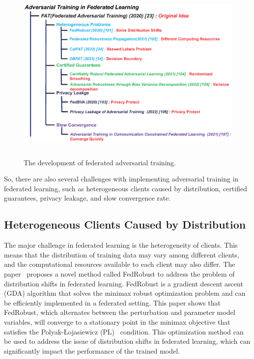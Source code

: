 \documentclass[pdflatex,sn-mathphys-num]{sn-jnl}%
\theoremstyle{thmstyleone}%
\theoremstyle{thmstyletwo}%
\theoremstyle{thmstylethree}%
\begin{document}
\begin{figure}[h]
	\centering
	\includegraphics[width=1.0\linewidth,height=3.5in]{output/fig20.eps}
	\caption{The development of federated adversarial training.}
	\label{fig20}
\end{figure}


So, there are also several challenges with
implementing adversarial training in federated learning, such as
heterogeneous clients caused by distribution, certified
guarantees, privacy leakage, and slow convergence rate.

\subsection{Heterogeneous Clients Caused by Distribution}
The major challenge in federated learning is the
heterogeneity of clients. This means that the distribution of
training data may vary among different clients, and the
computational resources available to each client may also
differ. The paper~\cite{reisizadeh2020robust} proposes a novel method called
FedRobust to address the problem of distribution shifts
in federated learning. FedRobust is a gradient descent
ascent (GDA) algorithm that solves the minimax robust
optimization problem and can be eﬀiciently implemented
in a federated setting. This paper shows that FedRobust,
which alternates between the perturbation and parameter
model variables, will converge to a stationary point in the
minimax objective that satisfies the Polyak-Łojasiewicz
(PL)~\cite{polyak1963gradient} condition. This optimization method can be
used to address the issue of distribution shifts in federated
learning, which can significantly impact the performance
of the trained model.
\end{document}
